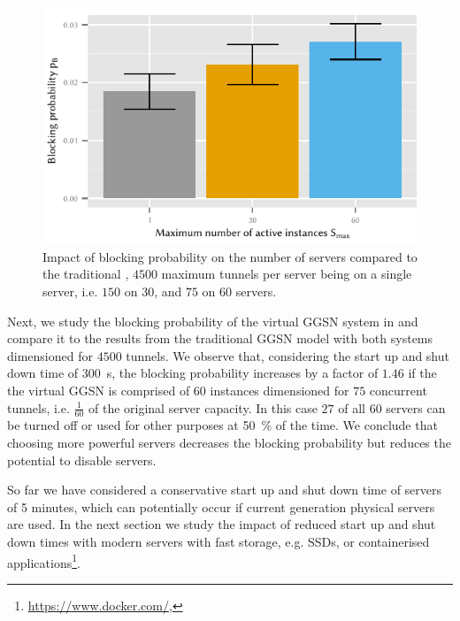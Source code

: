 \begin{figure}
  \centering
  \includegraphics{cloud/virtualized_network_functions/performance_evaluation/figures/blocking_comparison}
  \caption{Impact of blocking probability on the number of servers compared to the traditional , \(4500\) maximum tunnels per server being on a single server, i.e. \(150\) on \(30\), and \(75\) on \(60\) servers.}
  \label{fig:cloud:virtualized_network_functions:performance_evaluation:virtual_ggsn:blocking_comparison}
\end{figure}

Next, we study the blocking probability of the virtual \gls{GGSN} system in  and compare it to the results from the traditional \gls{GGSN} model with both systems dimensioned for \(4500\) tunnels.
We observe that, considering the start up and shut down time of \SI{300}{\second}, the blocking probability increases by a factor of \(1.46\) if the the virtual \gls{GGSN} is comprised of \(60\) instances dimensioned for \(75\) concurrent tunnels, i.e. \(\frac{1}{60}\) of the original server capacity.
In this case \(27\) of all \(60\) servers can be turned off or used for other purposes at \SI{50}{\percent} of the time.
We conclude that choosing more powerful servers decreases the blocking probability but reduces the potential to disable servers.

So far we have considered a conservative start up and shut down time of servers of 5 minutes, which can potentially occur if current generation physical servers are used.
In the next section we study the impact of reduced start up and shut down times with modern servers with fast storage, e.g. \glspl{SSD}, or containerised applications\footnote{\url{https://www.docker.com/}, \accessed}.

